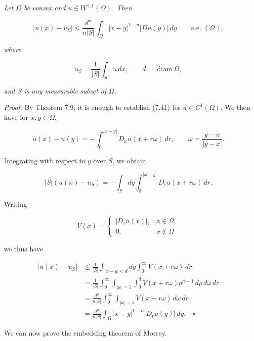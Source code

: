 \begin{lemma}\label{gt:lem-sobolev-convex-average-estimate}
\emph{Let $\Omega$ be convex and $u\in W^{1,1}(\Omega)$. Then}

\begin{equation}
\tag{7.41}
|u(x)-u_S|\leq \frac{d^n}{n|S|}\int_\Omega |x-y|^{1-n}|Du(y)|\,dy \qquad \text{a.e. }(\Omega),
\end{equation}

\emph{where}

\[
u_S=\frac{1}{|S|}\int_S u\,dx, \qquad d=\operatorname{diam}\Omega,
\]

\emph{and $S$ is any measurable subset of $\Omega$.}

\emph{Proof.} By Theorem 7.9, it is enough to establish (7.41) for $u\in C^1(\Omega)$. We then have for $x,y\in\Omega$,

\[
u(x)-u(y)=-\int_0^{|x-y|}D_{\omega}u(x+r\omega)\,dr,\qquad \omega=\frac{y-x}{|y-x|}.
\]


Integrating with respect to $y$ over $S$, we obtain

\[
|S|(u(x)-u_S)=-\int_S dy \int_0^{|x-y|} D_r u(x+r\omega)\,dr.
\]

Writing

\[
V(x)=
\begin{cases}
|D_r u(x)|, & x\in \Omega,\\
0, & x\notin \Omega
\end{cases}
\]

we thus have

\begin{align*}
|u(x)-u_S|
&\le \frac{1}{|S|}\int_{|x-y|<d} dy \int_0^\infty V(x+r\omega)\,dr \\
&= \frac{1}{|S|}\int_0^\infty \int_{|\omega|=1} \int_0^d V(x+r\omega)\rho^{n-1}\,d\rho\,d\omega\,dr \\
&= \frac{d^n}{n|S|}\int_0^\infty \int_{|\omega|=1} V(x+r\omega)\,d\omega\,dr \\
&= \frac{d^n}{n|S|}\int_\Omega |x-y|^{1-n}|D_r u(y)|\,dy. \quad \square
\end{align*}

We can now prove the embedding theorem of Morrey.

\end{lemma}

